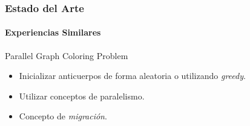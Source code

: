 \frame
{
\frametitle{Estado del Arte}
\framesubtitle{Experiencias Similares}
\begin{block}{Parallel Graph Coloring Problem}
\begin{itemize}
	\item Inicializar anticuerpos de forma aleatoria o utilizando \emph{greedy}.
	\item Utilizar conceptos de paralelismo.
	\item Concepto de \emph{migración}.
\end{itemize}
\end{block}
}

